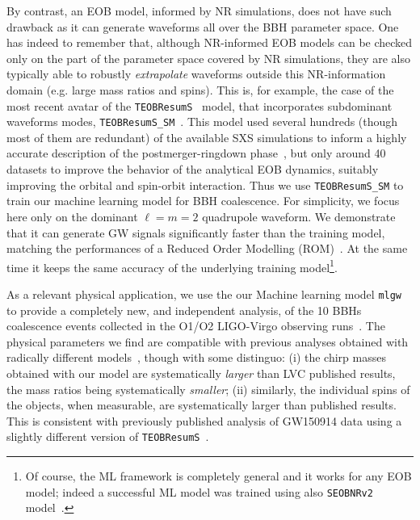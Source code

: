 By contrast, an EOB model, informed by NR simulations, does not have such drawback as 
it can generate waveforms all over the BBH parameter space. One has indeed to remember 
that, although NR-informed EOB models can be checked only on the part of the parameter space
covered by NR simulations, they are also typically able to robustly {\it extrapolate} waveforms 
outside this NR-information domain (e.g. large mass ratios and spins). This is, for example, 
the case of the most  recent avatar of the \texttt{TEOBResumS}~\cite{Nagar:2018zoe} model,
that incorporates subdominant waveforms modes,  \texttt{TEOBResumS\_SM}~\cite{Nagar:2019wds,Nagar:2020pcj}. 
This model used several hundreds (though most of them are redundant) of the available 
SXS simulations to inform a highly accurate description of the postmerger-ringdown 
phase~\cite{Damour:2014yha}, but only around 40 datasets to improve the behavior 
of the analytical EOB dynamics, suitably improving the orbital and spin-orbit interaction.
Thus we use \texttt{TEOBResumS\_SM} to train our machine learning model for BBH coalescence.
For simplicity, we focus here only on the dominant $\ell=m=2$ quadrupole waveform. 
We demonstrate that it can generate GW signals significantly faster than 
the training model, matching the performances of a Reduced Order Modelling 
(ROM)~\cite{Purrer:2015tud,Bohe:2016gbl,Purrer:2017str}.  At the same time it 
keeps the same accuracy of the underlying training model\footnote{Of course, 
the ML framework is completely general and it works for any EOB model; indeed 
a successful ML model was trained using also \texttt{SEOBNRv2} model~\cite{Taracchini_2014_SEOBNRv2}.}.

As a relevant physical application, we use the our Machine learning model \texttt{mlgw} to provide a completely new,
and independent analysis, of the 10 BBHs coalescence events collected in the O1/O2 LIGO-Virgo observing 
runs~\cite{LIGOScientific:2018mvr}. The physical parameters we find are compatible with previous
analyses obtained with radically different models~\cite{LIGOScientific:2018mvr}, though with some distinguo: 
(i) the chirp masses obtained with our model are systematically {\it larger} than LVC published results, the mass ratios being systematically {\it smaller}; 
(ii) similarly, the individual spins of the objects, when measurable, are systematically larger than published
results. This is consistent with previously published analysis of GW150914 data using a slightly different version 
of \texttt{TEOBResumS}~\cite{Nagar:2018zoe}.

